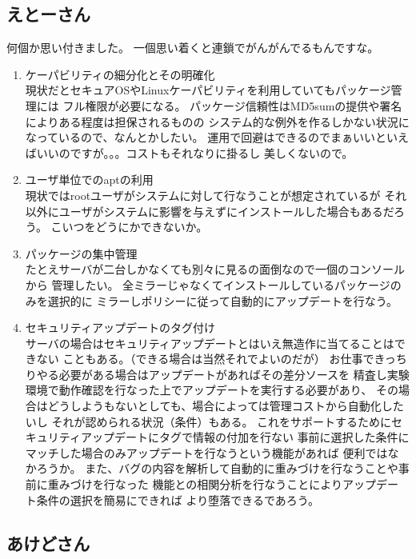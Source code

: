 \documentclass[mingoth,a4paper]{jsarticle}
\begin{document}
\subsection{えとーさん}

何個か思い付きました。
一個思い着くと連鎖でがんがんでるもんですな。

\begin{enumerate}
 \item  ケーパビリティの細分化とその明確化\\
 現状だとセキュアOSやLinuxケーパビリティを利用していてもパッケージ管理には
 フル権限が必要になる。
 パッケージ信頼性はMD5sumの提供や署名によりある程度は担保されるものの
 システム的な例外を作るしかない状況になっているので、なんとかしたい。
 運用で回避はできるのでまぁいいといえばいいのですが。。。コストもそれなりに掛るし
 美しくないので。

 \item ユーザ単位でのaptの利用\\
 現状ではrootユーザがシステムに対して行なうことが想定されているが
 それ以外にユーザがシステムに影響を与えずにインストールした場合もあるだろう。
 こいつをどうにかできないか。

 \item パッケージの集中管理\\
 たとえサーバが二台しかなくても別々に見るの面倒なので一個のコンソールから
 管理したい。
 全ミラーじゃなくてインストールしているパッケージのみを選択的に
 ミラーしポリシーに従って自動的にアップデートを行なう。

 \item セキュリティアップデートのタグ付け\\
 サーバの場合はセキュリティアップデートとはいえ無造作に当てることはできない
 こともある。（できる場合は当然それでよいのだが）
 お仕事できっちりやる必要がある場合はアップデートがあればその差分ソースを
 精査し実験環境で動作確認を行なった上でアップデートを実行する必要があり、
 その場合はどうしようもないとしても、場合によっては管理コストから自動化したいし
 それが認められる状況（条件）もある。
 これをサポートするためにセキュリティアップデートにタグで情報の付加を行ない
 事前に選択した条件にマッチした場合のみアップデートを行なうという機能があれば
 便利ではなかろうか。
 また、バグの内容を解析して自動的に重みづけを行なうことや事前に重みづけを行なった
 機能との相関分析を行なうことによりアップデート条件の選択を簡易にできれば
 より堕落できるであろう。

\end{enumerate}


\subsection{あけどさん}
\end{document}

